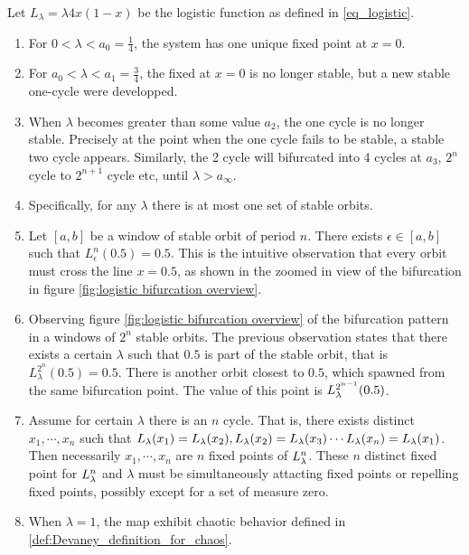 \begin{observation}\label{th:logistic_bifurcation}
	Let $L_{\lambda} = \lambda 4x(1-x) $ be the logistic function as defined in \ref{eq_logistic}.

	\begin{enumerate}
		\item For $0 < \lambda < a_0 = \frac{1}{4}$, the system has one unique fixed point at $x = 0$. \label{log_fix_0}

		\item For $a_0 <\lambda < a_1 = \frac{3}{4}$, the fixed at $x=0$ is no longer stable, but a new stable one-cycle were developped. \label{log_fix_1}

		\item When $\lambda$ becomes greater than some value $a_2$, the one cycle is no longer stable. 
		Precisely at the point when the one cycle fails to be stable, a stable two cycle appears. 
		Similarly, the 2 cycle will bifurcated into 4 cycles at $a_3$, $2^n$ cycle to $2^{n+1}$ cycle etc, until $\lambda > a_{\infty}$. 
		\label{log_periodic_doubling}
		\item Specifically, for any $\lambda$ there is at most one set of stable orbits. \label{log_at_most_one_stable_orbit}

		\item \label{log_cross_half} 
		Let $[a, b]$ be a window of stable orbit of period $n$.
		There exists $\epsilon \in [a, b]$ such that $L_{\epsilon}^n(0.5) = 0.5$. 
		This is the intuitive observation that every orbit must cross the line $x = 0.5$, as shown in the zoomed in view of the bifurcation in figure \ref{fig:logistic bifurcation overview}.
		\item \label{log_closest_branch}
		Observing figure \ref{fig:logistic bifurcation overview} of the bifurcation pattern in a windows of $2^n$ stable orbits. 
		The previous observation states that there exists a certain $\lambda$ such that $0.5$ is part of the stable orbit, that is $L_{\lambda}^{2^n}(0.5) = 0.5$.
		There is another orbit closest to $0.5$, which spawned from the same bifurcation point.
		The value of this point is $L_{\lambda}^{2^{n-1}}(0.5)$.

	\item \label{log_simul_stable_or_unstable}
		Assume for certain $\lambda$ there is an $n$ cycle. That is, there exists distinct $x_1, \cdots, x_n$ such that $L_{\lambda}(x_1) = L_{\lambda}(x_2), L_{\lambda}(x_2) = L_{\lambda}(x_3) \cdots L_{\lambda}(x_n) = L_{\lambda}(x_1)$.
		Then necessarily $x_1, \cdots, x_n$ are $n$ fixed points of $L_{\lambda}^n$. 
		These $n$ distinct fixed point for $L_{\lambda}^n$ and $\lambda$ must be simultaneously attacting fixed points or repelling fixed points, possibly except for a set of measure zero.

		\item  \label{log_chaos_at_1}
			When $\lambda = 1$, the map exhibit chaotic behavior defined in \ref{def:Devaney_definition_for_chaos}. 
	\end{enumerate}
\end{observation}

